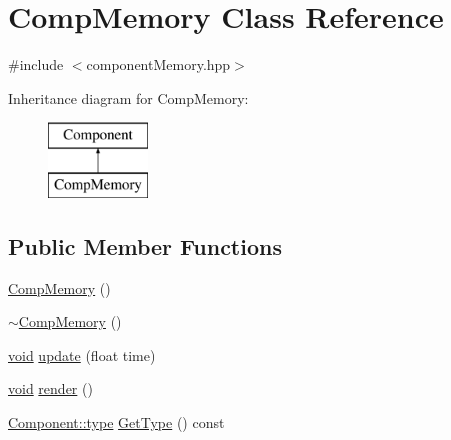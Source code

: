 \hypertarget{class_comp_memory}{\section{Comp\-Memory Class Reference}
\label{class_comp_memory}
}


{\ttfamily \#include $<$component\-Memory.\-hpp$>$}

Inheritance diagram for Comp\-Memory\-:\begin{figure}[H]
\begin{center}
\leavevmode
\includegraphics[height=2.000000cm]{class_comp_memory}
\end{center}
\end{figure}
\subsection*{Public Member Functions}
\begin{DoxyCompactItemize}
\item 
\hyperlink{class_comp_memory_a52c20a508512312f33175e89b1ca565f}{Comp\-Memory} ()
\item 
\hyperlink{class_comp_memory_ae9755d1c9212d9d0c4978fe29d70c3dd}{$\sim$\-Comp\-Memory} ()
\item 
\hyperlink{_s_d_l__opengles2__gl2ext_8h_ae5d8fa23ad07c48bb609509eae494c95}{void} \hyperlink{class_comp_memory_aa5ade8164c2bd2cea6f36b4d8c307cbb}{update} (float time)
\item 
\hyperlink{_s_d_l__opengles2__gl2ext_8h_ae5d8fa23ad07c48bb609509eae494c95}{void} \hyperlink{class_comp_memory_a327e5e6a1abac3d72c32f85b99baf592}{render} ()
\item 
\hyperlink{class_component_ad6d161b6acf7b843b55bb9feac7af71a}{Component\-::type} \hyperlink{class_comp_memory_abb43c1384fa0f909e590fbe11d855a72}{Get\-Type} () const 
\end{DoxyCompactItemize}
